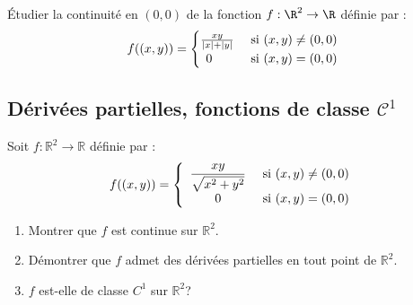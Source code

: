 \documentclass[a4paper,twoside,french,11pt]{VcCours}
\begin{document}
\begin{Exercice}{} Étudier la continuité en $(0,0)$ de la fonction $f : \R^{2} \rightarrow \R$ définie par :
  \[
  f((x,y)) =
  \begin{cases}
    \frac{xy}{\vert x \vert + \vert y \vert} & \hbox{ si } (x,y) \neq (0,0) \\
    \, \; 0 & \hbox{ si } (x,y)=(0,0)
  \end{cases}
  \]
\end{Exercice}



\subsection{Dérivées partielles, fonctions de classe \texorpdfstring{$\mathcal{C}^1$}{C¹}}


\begin{Exercice}{} Soit $f : \mathbb{R}^2 \rightarrow \mathbb{R}$ définie par :
$$ f((x,y)) = \left\lbrace \begin{array}{cl}
\dfrac{xy}{\sqrt{x^{2}+y^{2}}} & \hbox{ si } (x,y) \neq (0,0) \\
0 & \hbox{ si } (x,y) = (0,0)\\
\end{array}\right.$$

\begin{enumerate}
\item Montrer que $f$ est continue sur $\mathbb{R}^{2}$.
\item Démontrer que $f$ admet des d\'{e}riv\'{e}es partielles en tout point de $\mathbb{R}^{2}$.
\item $f$ est-elle de classe $C^{1}$ sur $\mathbb{R}^2$?
\end{enumerate}
\end{Exercice}
\end{document}
